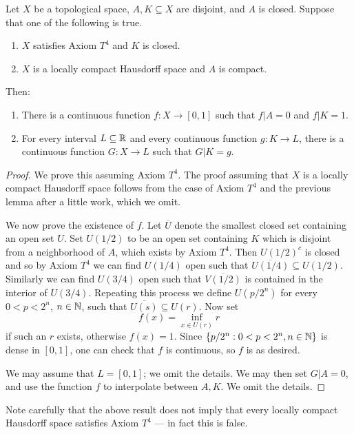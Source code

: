 \begin{theorem}\label{Urysohn and Tietze}
Let $X$ be a topological space, $A, K \subseteq X$ are disjoint, and $A$ is closed. Suppose that one of the following is true.
\begin{enumerate}
\item $X$ satisfies Axiom $T^{4}$ and $K$ is closed.
\item $X$ is a locally compact Hausdorff space and $A$ is compact.
\end{enumerate}
Then:
\begin{enumerate}
\item There is a continuous function $f: X \to [0, 1]$ such that $f|A = 0$ and $f|K = 1$.
\item For every interval $L \subseteq \mathbb{R}$ and every continuous function $g: K \to L$, there is a continuous function $G: X \to L$ such that $G|K = g$.
\end{enumerate}
\end{theorem}
\begin{proof}
We prove this assuming Axiom $T^{4}$. The proof assuming that $X$ is a locally compact Hausdorff space follows from the case of Axiom $T^{4}$ and the previous lemma after a little work, which we omit.

We now prove the existence of $f$.
Let $\overline U$ denote the smallest closed set containing an open set $U$.
Set $U(1/2)$ to be an open set containing $K$ which is disjoint from a neighborhood of $A$, which exists by Axiom $T^{4}$.
Then $U{(1/2)}^{c}$ is closed and so by Axiom $T^{4}$ we can find $U(1/4)$ open such that $\overline{U(1/4)} \subseteq U(1/2)$.
Similarly we can find $U(3/4)$ open such that $\overline{V(1/2)}$ is contained in the interior of $U(3/4)$.
Repeating this process we define $U(p/2^{n})$ for every $0 < p < 2^{n}$, $n \in \mathbb{N}$, such that $\overline{U(s)} \subseteq U(r)$.
Now set
\[f(x) = \inf_{x \in U(r)} r\]
if such an $r$ exists, otherwise $f(x) = 1$.
Since $\{p/2^{n}: 0 < p < 2^{n}, n \in \mathbb{N}\}$ is dense in $[0, 1]$, one can check that $f$ is continuous, so $f$ is as desired.

We may assume that $L = [0, 1]$; we omit the details.
We may then set $G|A = 0$, and use the function $f$ to interpolate between $A,K$. We omit the details.
\end{proof}

\begin{subsec}
Note carefully that the above result does not imply that every locally compact Hausdorff space satisfies Axiom $T^{4}$ --- in fact this is false.
\end{subsec}

